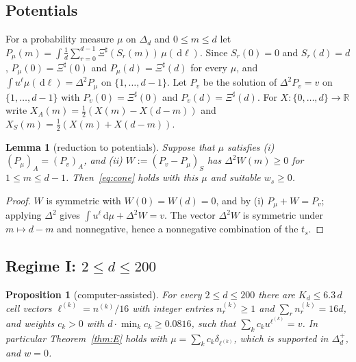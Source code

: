 \documentclass[11pt]{amsart}
\newtheorem{lemma}[theorem]{Lemma}
\newtheorem{proposition}[theorem]{Proposition}
\theoremstyle{definition}
\theoremstyle{remark}
\numberwithin{equation}{section}
\newcommand{\R}{\mathbb{R}}
\newcommand{\Sh}{\Xi^{\sharp}}
\newcommand{\dd}{\,\mathrm{d}}
\begin{document}
\subsection{Potentials}
For a probability measure $\mu$ on $\Delta_d$ and $0\le m\le d$ let
$P_\mu(m)=\int\frac1d\sum_{r=0}^{d-1}\Sh(S_r(m))\,\mu(\dd\ell)$. Since $S_r(0)=0$ and $S_r(d)=d$, $P_\mu(0)=\Sh(0)$ and
$P_\mu(d)=\Sh(d)$ for every $\mu$, and $\int u^\ell\mu(\dd\ell)=\Delta^2P_\mu$ on $\{1,\dots,d-1\}$. Let $P_v$ be the solution of
$\Delta^2P_v=v$ on $\{1,\dots,d-1\}$ with $P_v(0)=\Sh(0)$ and $P_v(d)=\Sh(d)$. For $X\colon\{0,\dots,d\}\to\R$ write
$X_A(m)=\frac12(X(m)-X(d-m))$ and $X_S(m)=\frac12(X(m)+X(d-m))$.

\begin{lemma}[reduction to potentials]\label{lem:R1}
Suppose that $\mu$ satisfies (i) $(P_\mu)_A=(P_v)_A$, and (ii) $W:=(P_v-P_\mu)_S$ has $\Delta^2W(m)\ge0$ for $1\le m\le d-1$.
Then~\eqref{eq:cone} holds with this $\mu$ and suitable $w_s\ge0$.
\end{lemma}

\begin{proof}
$W$ is symmetric with $W(0)=W(d)=0$, and by (i) $P_\mu+W=P_v$; applying $\Delta^2$ gives $\int u^\ell\dd\mu+\Delta^2W=v$. The
vector $\Delta^2W$ is symmetric under $m\mapsto d-m$ and nonnegative, hence a nonnegative combination of the $t_s$.
\end{proof}

\subsection{Regime I: \texorpdfstring{$2\le d\le200$}{d <= 200}}\label{subsec:regimeI}

\begin{proposition}[computer-assisted]\label{prop:regimeI}
For every $2\le d\le200$ there are $K_d\le6.3\,d$ cell vectors $\ell^{(k)}=n^{(k)}/16$ with integer entries
$n^{(k)}_r\ge1$ and $\sum_rn^{(k)}_r=16d$, and weights $c_k>0$ with $d\cdot\min_kc_k\ge0.0816$, such that
$\sum_kc_ku^{\ell^{(k)}}=v$. In particular Theorem~\ref{thm:E} holds with $\mu=\sum_kc_k\delta_{\ell^{(k)}}$, which is supported in
$\Delta_d^+$, and $w=0$.
\end{proposition}
\end{document}
